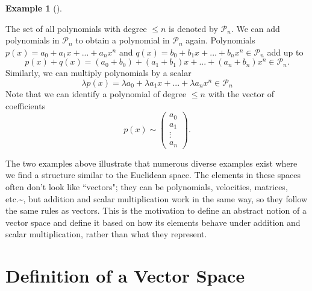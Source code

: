 \documentclass[
  a4paper,
  DIV=11,
  numbers=noendperiod,
  oneside]{scrreprt}
\theoremstyle{definition}
\newtheorem{example}{Example}[chapter]
\theoremstyle{remark}
\begin{document}
\begin{example}[]\protect\hypertarget{exm-}{}\label{exm-}

The set of all polynomials with degree \(\leq n\) is denoted by
\(\mathcal{P}_{n}\). We can add polynomials in \(\mathcal{P}_{n}\) to
obtain a polynomial in \(\mathcal{P}_{n}\) again. Polynomials
\(p(x)= a_{0} + a_{1}x + ...+a_{n} x^{n}\) and
\(q(x)= b_{0} + b_{1}x + ...+b_{n} x^{n}\)\(\in \mathcal{P}_{n}\) add up
to
\[p(x)+q(x)  =  (a_{0}+ b_{0}) + (a_{1} + b_{1}) x + ...+(a_{n}+ b_{n}) x^{n}   \in \mathcal{P}_{n} .\]
Similarly, we can multiply polynomials by a scalar
\[\lambda p(x)  =   \lambda a_{0} +  \lambda a_{1}x + ...+ \lambda a_{n} x^{n}  \in \mathcal{P}_{n}\]
Note that we can identify a polynomial of degree \(\leq n\) with the
vector of coefficients
\[p(x) \sim  \scriptstyle \begin{pmatrix}    a_{0} \\ a_{1} \\ \vdots \\ a_{n}   \end{pmatrix} \textstyle.\]

\end{example}

The two examples above illustrate that numerous diverse examples exist
where we find a structure similar to the Euclidean space. The elements
in these spaces often don't look like ``vectors"; they can be
polynomials, velocities, matrices, etc.\textasciitilde, but addition and
scalar multiplication work in the same way, so they follow the same
rules as vectors. This is the motivation to define an abstract notion of
a vector space and define it based on how its elements behave under
addition and scalar multiplication, rather than what they represent.

\section{Definition of a Vector
Space}\label{definition-of-a-vector-space}
\end{document}
